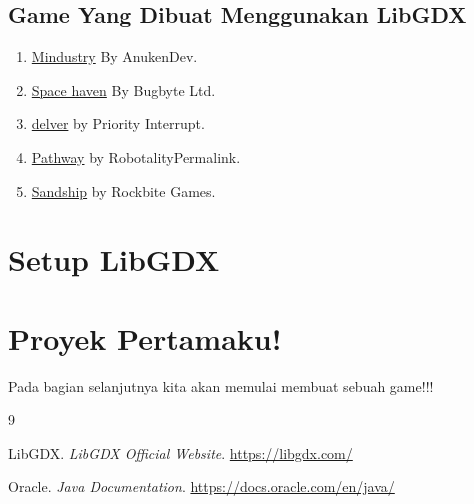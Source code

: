\documentclass{article}
\newenvironment{info}
{\begin{mdframed}[
    linewidth=2pt,
    linecolor=info_color,
    backgroundcolor=white
]
}
{\end{mdframed}}
\begin{document}
\subsection{Game Yang Dibuat Menggunakan LibGDX}
\begin{enumerate}[itemsep=0pt]
    \item \href{https://store.steampowered.com/app/1127400/Mindustry/}{Mindustry} By AnukenDev.
    \item \href{https://store.steampowered.com/app/979110/Space_Haven/}{Space haven} By Bugbyte Ltd.
    \item \href{https://store.steampowered.com/app/249630/Delver/}{delver} by Priority Interrupt.
    \item \href{https://store.steampowered.com/app/546430/Pathway/}{Pathway} by RobotalityPermalink.
    \item \href{https://rockbitegames.com/games/sandship}{Sandship} by Rockbite Games.
\end{enumerate}

\newpage

\section{Setup LibGDX}
\newpage

\section{Proyek Pertamaku!}
\newpage
\centering
\vspace*{\fill}
\begin{info}
Pada bagian selanjutnya kita akan memulai membuat sebuah game!!!
\end{info}
\vspace*{\fill}
\newpage
\begin{thebibliography}{9}

LibGDX.
\textit{LibGDX Official Website}.
\url{https://libgdx.com/}

Oracle.
\textit{Java Documentation}.
\url{https://docs.oracle.com/en/java/}

\end{thebibliography}
\end{document}
